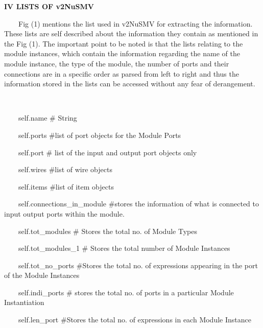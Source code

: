 \documentclass[a4paper]{article}
\begin{document}
{\color[rgb]{0.0,0.0,0.039215688}
\textrm{\textbf{IV LISTS OF v2NuSMV}}}

{\color[rgb]{0.0,0.0,0.039215688}
\textrm{\ \ }\textrm{\ \ Fig (1) mentions the list used in v2NuSMV for
extracting the information. These lists are self described about the
information they contain as mentioned in the Fig (1). The important
point to be noted is that the lists relating to the module instances,
which contain the information regarding the name of the module
instance, the type of the module, the number of ports and their
connections are in a specific order as parsed from left to right and
thus the information stored in the lists can be accessed without any
fear of derangement.}}

{\ttfamily\color[rgb]{0.0,0.0,0.039215688}
\ \ \ \ }

\begin{center}
\begin{minipage}{6.63542in}
{\ttfamily\color[rgb]{0.0,0.0,0.039215688}
\ \ \ \ self.name \# String}

{\ttfamily\color[rgb]{0.0,0.0,0.039215688}
\ \ \ \ self.ports \#list of port objects for the Module Ports\ }

{\ttfamily\color[rgb]{0.0,0.0,0.039215688}
\ \ \ \ self.port \# list of the input and output port objects only}

{\ttfamily\color[rgb]{0.0,0.0,0.039215688}
\ \ \ \ self.wires \#list of wire objects}

{\ttfamily\color[rgb]{0.0,0.0,0.039215688}
\ \ \ \ self.items \#list of item objects}

{\ttfamily\color[rgb]{0.0,0.0,0.039215688}
\ \ \ \ self.connections\_in\_module \#stores the information of what is
connected to input output ports within the module.}

{\ttfamily\color[rgb]{0.0,0.0,0.039215688}
\ \ \ \ self.tot\_modules \# Stores the total no. of Module Types\ }

{\ttfamily\color[rgb]{0.0,0.0,0.039215688}
\ \ \ \ self.tot\_modules\_1 \# Stores the total number of Module
Instances}

{\ttfamily\color[rgb]{0.0,0.0,0.039215688}
\ \ \ \ self.tot\_no\_ports \#Stores the total no. of expressions
appearing in the port of the Module Instances \ \ }

{\ttfamily\color[rgb]{0.0,0.0,0.039215688}
\ \ \ \ self.indi\_ports \# stores the total no. of ports in a
particular Module Instantiation \ }

{\ttfamily\color[rgb]{0.0,0.0,0.039215688}
\ \ \ \ self.len\_port \#Stores the total no. of expressions in each
Module Instance}


\end{minipage}
\end{center}
\end{document}
